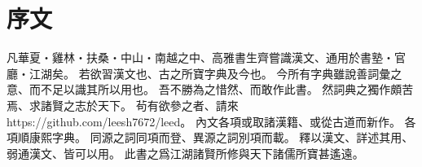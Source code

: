 \chapter*{序文}
凡華夏・雞林・扶桑・中山・南越之中、高雅書生齊嘗識漢文、通用於書塾・官廳・江湖矣。
若欲習漢文也、古之所寶字典及今也。
今所有字典雖說善詞彙之意、而不足以識其所以用也。
吾不勝為之惜然、而敢作此書。
然詞典之獨作頗苦焉、求諸賢之志於天下。
茍有欲參之者、請來 https://github.com/leesh7672/leed。
內文各項或取諸漢籍、或從古道而新作。
各項順康熙字典。
同源之詞同項而登、異源之詞別項而載。
釋以漢文、詳述其用、弱通漢文、皆可以用。
此書之爲江湖諸賢所修與天下諸儒所寶甚遙遠。
